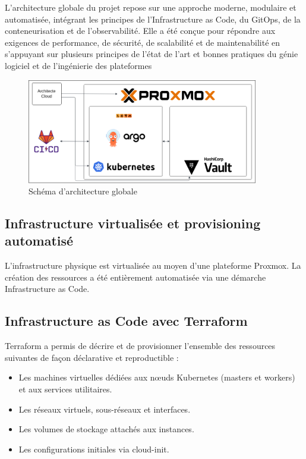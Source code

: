 L'architecture globale du projet repose sur une approche moderne, modulaire et automatisée, intégrant les principes de l'Infrastructure as Code, du GitOps, de la conteneurisation et de l'observabilité. Elle a été conçue pour répondre aux exigences de performance, de sécurité, de scalabilité et de maintenabilité en s'appuyant sur plusieurs principes de l’état de l’art et bonnes pratiques du génie logiciel et de l’ingénierie des plateformes
\begin{figure}[H]
	\centering
	\includegraphics[width=0.9\textwidth]{figures/architecture-globale.png}
	\caption{Schéma d'architecture globale}
\end{figure}

\subsection{Infrastructure virtualisée et provisioning automatisé}

L'infrastructure physique est virtualisée au moyen d'une plateforme Proxmox. La création des ressources a été entièrement automatisée via une démarche Infrastructure as Code.

\subsection*{Infrastructure as Code avec Terraform}

Terraform a permis de décrire et de provisionner l'ensemble des ressources suivantes de façon déclarative et reproductible :
\begin{itemize}
	\item Les machines virtuelles dédiées aux nœuds Kubernetes (masters et workers) et aux services utilitaires.
	\item Les réseaux virtuels, sous-réseaux et interfaces.
	\item Les volumes de stockage attachés aux instances.
	\item Les configurations initiales via cloud-init.
\end{itemize}

